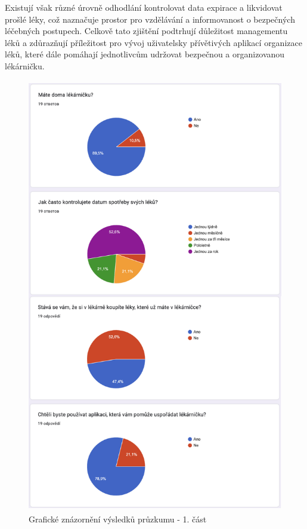 \documentclass[a4paper, 11pt]{article}
\begin{document}
Existují však různé úrovně odhodlání kontrolovat data expirace a likvidovat prošlé léky, což naznačuje prostor pro vzdělávání a informovanost o bezpečných léčebných postupech. Celkově tato zjištění podtrhují důležitost managementu léků a zdůrazňují příležitost pro vývoj uživatelsky přívětivých aplikací organizace léků, které dále pomáhají jednotlivcům udržovat bezpečnou a organizovanou lékárničku.

\newpage
\begin{figure}[!ht]
		\centering
		\includegraphics[width=\textwidth,height=720,keepaspectratio]{Pruzkum.pdf}
		\caption{Grafické znázornění výsledků průzkumu - 1. část}
		\label{figure:pruzkum}
	\end{figure}
\end{document}
